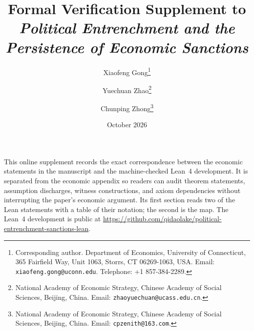 \documentclass[11pt]{article}
\title{Formal Verification Supplement to\\
       \emph{Political Entrenchment and the Persistence of Economic Sanctions}}
\author{Xiaofeng Gong\thanks{Corresponding author. Department of
Economics, University of Connecticut, 365 Fairfield Way, Unit 1063,
Storrs, CT 06269-1063, USA. Email:
\texttt{xiaofeng.gong@uconn.edu}. Telephone: +1 857-384-2289.}
\and Yuechuan Zhao\thanks{National Academy of Economic Strategy, Chinese Academy of
Social Sciences, Beijing, China. Email: \texttt{zhaoyuechuan@ucass.edu.cn}.}
\and Chunping Zhong\thanks{National Academy of Economic Strategy, Chinese Academy of
Social Sciences, Beijing, China. Email: \texttt{cpzenith@163.com}.}}
\date{October 2026}
\numberwithin{equation}{section}
\numberwithin{theorem}{section}
\begin{document}
\maketitle

\noindent
This online supplement records the exact correspondence between the
economic statements in the manuscript and the machine-checked Lean~4
development.  It is separated from the economic appendix so readers
can audit theorem statements, assumption discharges, witness
constructions, and axiom dependencies without interrupting the paper's
economic argument. Its first section reads two of the Lean statements with a table of
their notation; the second is the map. The Lean~4 development is public at
\url{https://github.com/qidaolake/political-entrenchment-sanctions-lean}.

\appendix
{}






\end{document}
